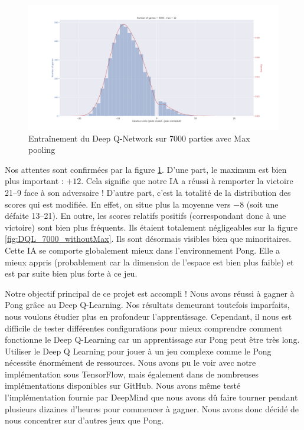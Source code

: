 \begin{figure}[h]
 \centering
 \includegraphics[width  = \textwidth]{img/DQL_7000_withMax.png}
 \caption{Entraînement du Deep Q-Network sur 7000 parties avec Max pooling}
 \label{fig:DQL_7000_withMax}
\end{figure}

Nos attentes sont confirmées par la figure \ref{fig:DQL_7000_withMax}. D'une part, le maximum est bien plus important : $+\num{12}$. Cela signifie que notre IA a 
réussi à remporter la victoire 21--9 face à son adversaire ! D'autre part, c'est la totalité de la distribution des scores qui est modifiée. En effet, on situe 
plus la moyenne vers $\num{-8}$ (soit une défaite 13--21). En outre, les scores relatifs positifs (correspondant donc à une victoire) sont bien plus fréquents. Ils
étaient totalement négligeables sur la figure \ref{fig:DQL_7000_withoutMax}. Ils sont désormais visibles bien que minoritaires. Cette IA se comporte
globalement mieux dans l'environnement Pong. Elle a mieux appris (probablement car la dimension de l'espace est bien plus faible) et est par suite bien plus forte
à ce jeu.

Notre objectif principal de ce projet est accompli ! Nous avons réussi à gagner à Pong grâce au Deep Q-Learning. Nos résultats demeurant toutefois imparfaits, nous
voulons étudier plus en profondeur l'apprentissage. Cependant, il nous est difficile de tester différentes configurations pour mieux comprendre comment fonctionne le Deep Q-Learning car un apprentissage sur Pong peut être très long. Utiliser le Deep Q Learning pour jouer à un jeu complexe comme le Pong nécessite énormément de ressources. Nous avons pu le voir avec notre implémentation sous TensorFlow, mais également dans de nombreuses implémentations disponibles sur GitHub. Nous avons même testé l'implémentation fournie par DeepMind que nous avons dû faire tourner pendant plusieurs dizaines d'heures pour commencer à gagner. Nous avons donc décidé de nous concentrer sur d'autres jeux que Pong.


